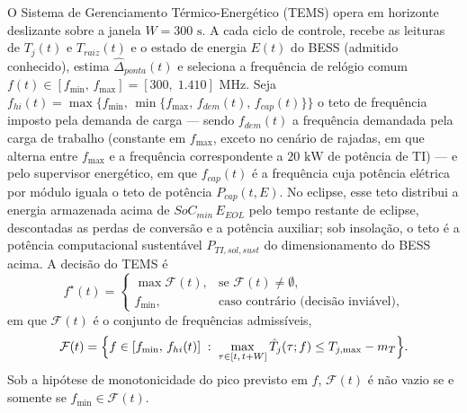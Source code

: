 O Sistema de Gerenciamento Térmico-Energético (TEMS) opera em horizonte deslizante sobre a janela $W = 300\text{ s}$. A cada ciclo de controle, recebe as leituras de $T_j(t)$ e $T_{raiz}(t)$ e o estado de energia $E(t)$ do BESS (admitido conhecido), estima $\hat{\Delta}_{ponta}(t)$ e seleciona a frequência de relógio comum $f(t) \in [f_{\min},\, f_{\max}] = [300,\; 1.410]\text{ MHz}$. Seja $f_{hi}(t) = \max\{f_{\min},\, \min\{f_{\max},\, f_{dem}(t),\, f_{cap}(t)\}\}$ o teto de frequência imposto pela demanda de carga — sendo $f_{dem}(t)$ a frequência demandada pela carga de trabalho (constante em $f_{\max}$, exceto no cenário de rajadas, em que alterna entre $f_{\max}$ e a frequência correspondente a $20\text{ kW}$ de potência de TI) — e pelo supervisor energético, em que $f_{cap}(t)$ é a frequência cuja potência elétrica por módulo iguala o teto de potência $P_{cap}(t, E)$. No eclipse, esse teto distribui a energia armazenada acima de $SoC_{min}\,E_{EOL}$ pelo tempo restante de eclipse, descontadas as perdas de conversão e a potência auxiliar; sob insolação, o teto é a potência computacional sustentável $P_{TI,sol,sust}$ do dimensionamento do BESS acima. A decisão do TEMS é
\begin{equation}
f^{\star}(t) =
\begin{cases}
\max \mathcal{F}(t), & \text{se } \mathcal{F}(t) \neq \emptyset, \\[4pt]
f_{\min}, & \text{caso contrário (decisão inviável),}
\end{cases}
\label{eq:tems_otimizacao}
\end{equation}
em que $\mathcal{F}(t)$ é o conjunto de frequências admissíveis,
\begin{equation}
\mathcal{F}(t) = \Bigl\{ f \in [f_{\min},\, f_{hi}(t)] \;:\; \max_{\tau \in [t,\, t+W]} \hat{T}_j(\tau; f) \le T_{j,\max} - m_T \Bigr\}.
\label{eq:tems_admissivel}
\end{equation}
Sob a hipótese de monotonicidade do pico previsto em $f$, $\mathcal{F}(t)$ é não vazio se e somente se $f_{\min} \in \mathcal{F}(t)$.
